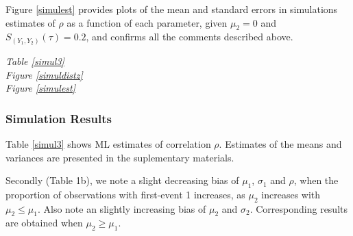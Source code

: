 \documentclass[twoside,a4paper,12pt]{article}
\theoremstyle{plain}
\theoremstyle{definition}
\begin{document}
Figure \ref{simulest} provides plots of the mean and standard errors in simulations estimates of 
$\rho$ as a function of each parameter, given $\mu_{2}=0$ and 
$S_{(Y_1,Y_2)}(\tau)=0.2$, and confirms all the comments described above. 


\noindent \textit{Table \ref{simul3}} \\
\textit{Figure \ref{simuldistz}}\\
\textit{Figure \ref{simulest}} \\


\subsubsection{Simulation Results}
Table \ref{simul3} %
shows ML estimates of  correlation $\rho$.  Estimates of the means and variances are presented in the suplementary materials.

%
%
%
%

Secondly (Table 1b), we note a slight decreasing bias of $\mu_1$, $\sigma_1$ and $\rho$, when the 
proportion of observations with first-event 1 increases,
as $\mu_2$ increases with $\mu_2\leq \mu_1$. 
Also note an slightly increasing bias of $\mu_2$ and $\sigma_2$. 
Corresponding results are obtained when $\mu_2\geq \mu_1$. 
\end{document}
